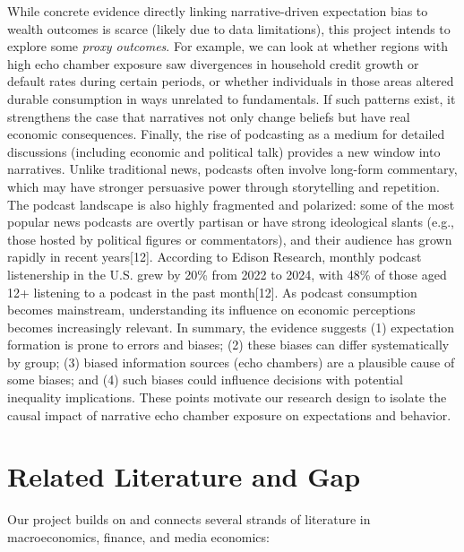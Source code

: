 \documentclass[12pt]{article}
\begin{document}
While concrete evidence directly linking narrative-driven expectation bias to wealth outcomes is scarce (likely due to data limitations), this project intends to explore some \emph{proxy outcomes}. For example, we can look at whether regions with high echo chamber exposure saw divergences in household credit growth or default rates during certain periods, or whether individuals in those areas altered durable consumption in ways unrelated to fundamentals. If such patterns exist, it strengthens the case that narratives not only change beliefs but have real economic consequences.
Finally, the rise of podcasting as a medium for detailed discussions (including economic and political talk) provides a new window into narratives. Unlike traditional news, podcasts often involve long-form commentary, which may have stronger persuasive power through storytelling and repetition. The podcast landscape is also highly fragmented and polarized: some of the most popular news podcasts are overtly partisan or have strong ideological slants (e.g., those hosted by political figures or commentators), and their audience has grown rapidly in recent years[12]. According to Edison Research, monthly podcast listenership in the U.S. grew by 20\% from 2022 to 2024, with 48\% of those aged 12+ listening to a podcast in the past month[12]. As podcast consumption becomes mainstream, understanding its influence on economic perceptions becomes increasingly relevant.
In summary, the evidence suggests (1) expectation formation is prone to errors and biases; (2) these biases can differ systematically by group; (3) biased information sources (echo chambers) are a plausible cause of some biases; and (4) such biases could influence decisions with potential inequality implications. These points motivate our research design to isolate the causal impact of narrative echo chamber exposure on expectations and behavior.

\section{Related Literature and Gap}
Our project builds on and connects several strands of literature in macroeconomics, finance, and media economics:
\end{document}
